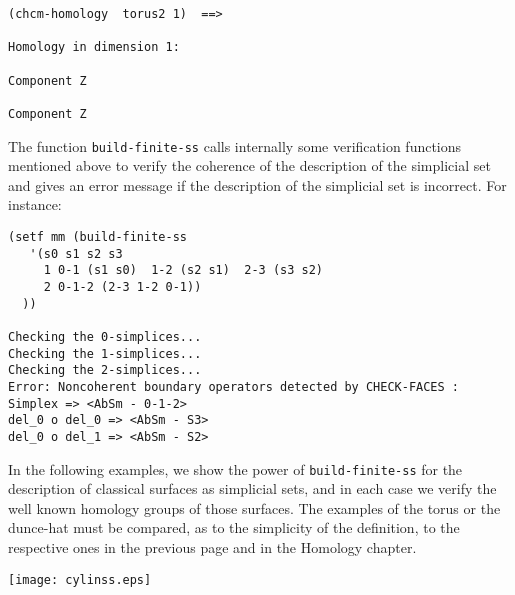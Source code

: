 {\footnotesize\begin{verbatim}
(chcm-homology  torus2 1)  ==>

Homology in dimension 1:

Component Z

Component Z
\end{verbatim}}
The function {\tt build-finite-ss} calls internally some verification functions mentioned above
to verify the coherence of the description of the simplicial set and gives
an error message if the description of the simplicial set is incorrect. For instance:
{\footnotesize\begin{verbatim}
(setf mm (build-finite-ss
   '(s0 s1 s2 s3
     1 0-1 (s1 s0)  1-2 (s2 s1)  2-3 (s3 s2)
     2 0-1-2 (2-3 1-2 0-1))
  ))

Checking the 0-simplices...
Checking the 1-simplices...
Checking the 2-simplices...
Error: Noncoherent boundary operators detected by CHECK-FACES :
Simplex => <AbSm - 0-1-2>
del_0 o del_0 => <AbSm - S3>
del_0 o del_1 => <AbSm - S2>
\end{verbatim}}
\vskip 0.35cm
In the following examples, we show the power of {\tt build-finite-ss} for the description
of classical surfaces as simplicial sets, and in each case we  verify the well known
homology groups of those surfaces. The examples of the torus
or the dunce-hat must be compared, as to the simplicity of the definition, to the respective
ones in the previous page and in  the Homology chapter.
\newpage
%
\vskip 0.40cm
\centerline{\texttt{[image: cylinss.eps]}}
\vskip 0.40cm
%


